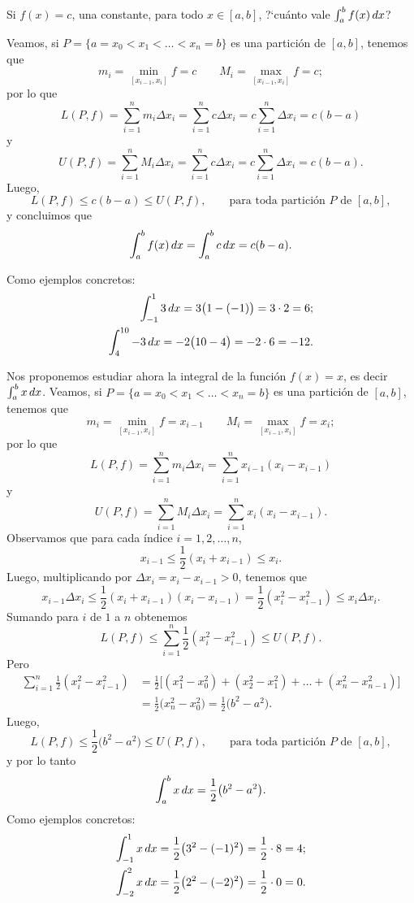 \begin{example}
  Si $f(x)=c$, una constante, para todo $x\in[a,b]$, ?`cuánto vale $\int_a^b f(x)\,dx$?

  Veamos, si $P=\{a=x_0<x_1<\dots<x_n=b\}$ es una partición de $[a,b]$, tenemos que 
\[ 
    m_i = \min_{[x_{i-1},x_i]}f = c
    \qquad
    M_i = \max_{[x_{i-1},x_i]}f = c;
  \]
  por lo que 
  \[
  L(P,f)
  = \sum_{i=1}^n m_i \Delta x_i
  = \sum_{i=1}^n c \Delta x_i
  = c \sum_{i=1}^n \Delta x_i
  = c (b-a)
  \]
  y 
  \[
  U(P,f)
  = \sum_{i=1}^n M_i \Delta x_i
  = \sum_{i=1}^n c \Delta x_i
  = c \sum_{i=1}^n \Delta x_i
  = c (b-a).
  \]
  Luego, 
  \[
    L(P,f)\le c(b-a)\le U(P,f),
    \qquad\text{para toda partición $P$ de $[a,b]$},
  \]
  y concluimos que 
  \[
  \int_a^b f(x)\,dx = \int_a^b c \,dx = c (b-a).
  \]

  Como ejemplos concretos:
  \begin{align*}
    \int_{-1}^1 3 \,dx = 3 \big(1 - (-1)\big) = 3 \cdot 2 = 6;
    \\
    \int_{4}^{10} -3 \,dx = -2 \big(10 - 4\big) = -2 \cdot 6 = -12.
  \end{align*}
\end{example}

\begin{example}
  Nos proponemos estudiar ahora la integral de la función $f(x)=x$, es decir $\int_a^b x\,dx$.
  Veamos, si $P=\{a=x_0<x_1<\dots<x_n=b\}$ es una partición de $[a,b]$, tenemos que 
  \[ 
      m_i = \min_{[x_{i-1},x_i]}f = x_{i-1}
      \qquad
      M_i = \max_{[x_{i-1},x_i]}f = x_i;
    \]
    por lo que 
    \[
    L(P,f)
    = \sum_{i=1}^n m_i \Delta x_i
    = \sum_{i=1}^n x_{i-1} (x_{i}-x_{i-1})
    \]
    y 
    \[
    U(P,f)
    = \sum_{i=1}^n M_i \Delta x_i
    = \sum_{i=1}^n x_{i} (x_{i}-x_{i-1}).
    \]
    Observamos que para cada índice $i=1,2,\dots,n$, 
    \[
    x_{i-1}\le \frac12 (x_i+x_{i-1})\le x_i.
    \]
    Luego, multiplicando por $\Delta x_i = x_i-x_{i-1}>0$, tenemos que
    \[
    x_{i-1} \Delta x_i 
    \le \frac12 (x_i+x_{i-1})(x_i-x_{i-1}) 
    = \frac12 (x_i^2-x_{i-1}^2)  
    \le x_i \Delta x_i.
    \]
    Sumando para $i$ de $1$ a $n$ obtenemos
    \[
    L(P,f) \le \sum_{i=1}^n \frac12 (x_i^2-x_{i-1}^2) \le U(P,f).
    \]
    Pero 
    \begin{align*}
      \sum_{i=1}^n \frac12 (x_i^2-x_{i-1}^2)
      &= \frac12 \Big[ (x_1^2-x_0^2) + (x_2^2-x_1^2) + \dots + (x_n^2-x_{n-1}^2)  \Big]
      \\
      &= \frac12 \big(x_n^2-x_0^2\big)
      = \frac12 \big(b^2-a^2\big).
    \end{align*}
    Luego, 
    \[
      L(P,f)\le \frac12 \big(b^2-a^2\big) \le U(P,f),
      \qquad\text{para toda partición $P$ de $[a,b]$},
    \]
    y por lo tanto
    \[
    \int_a^b x\,dx = \frac12 \big(b^2-a^2\big).
    \]
    Como ejemplos concretos:
    \begin{align*}
      \int_{-1}^1 x \,dx = \frac12 \big(3^2 - (-1)^2\big) = \frac12 \cdot 8 = 4;
      \\
      \int_{-2}^{2} x \,dx = \frac12 \big(2^2 - (-2)^2\big) = \frac12 \cdot 0 = 0.
    \end{align*}\end{example}

